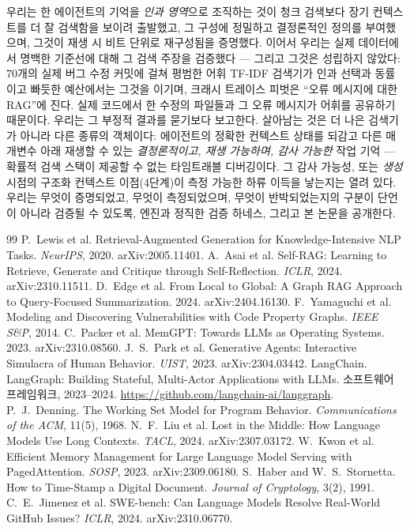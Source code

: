 \documentclass[11pt]{article}
\begin{document}
우리는 한 에이전트의 기억을 \emph{인과 영역}으로 조직하는 것이 청크 검색보다 장기 컨텍스트를 더 잘 검색함을 보이려
출발했고, 그 구성에 정밀하고 결정론적인 정의를 부여했으며, 그것이 재생 시 비트 단위로 재구성됨을 증명했다. 이어서 우리는
실제 데이터에서 명백한 기준선에 대해 그 검색 주장을 검증했다 --- 그리고 그것은 성립하지 않았다: $70$개의 실제 버그 수정
커밋에 걸쳐 평범한 어휘 TF-IDF 검색기가 인과 선택과 동률이고 빠듯한 예산에서는 그것을 이기며, 크래시 트레이스 피벗은
``오류 메시지에 대한 RAG''에 진다. 실제 코드에서 한 수정의 파일들과 그 오류 메시지가 어휘를 공유하기 때문이다. 우리는 그
부정적 결과를 묻기보다 보고한다. 살아남는 것은 더 나은 검색기가 아니라 다른 종류의 객체이다: 에이전트의 정확한 컨텍스트
상태를 되감고 다른 매개변수 아래 재생할 수 있는 \emph{결정론적이고, 재생 가능하며, 감사 가능한} 작업 기억 --- 확률적 검색
스택이 제공할 수 없는 타임트래블 디버깅이다. 그 감사 가능성, 또는 \emph{생성} 시점의 구조화 컨텍스트 이점(4단계)이
측정 가능한 하류 이득을 낳는지는 열려 있다. 우리는 무엇이 증명되었고, 무엇이 측정되었으며, 무엇이 반박되었는지의 구분이
단언이 아니라 검증될 수 있도록, 엔진과 정직한 검증 하네스, 그리고 본 논문을 공개한다.

\begin{thebibliography}{99}
 P.~Lewis et al. Retrieval-Augmented Generation for
Knowledge-Intensive NLP Tasks. \emph{NeurIPS}, 2020. arXiv:2005.11401.
 A.~Asai et al. Self-RAG: Learning to Retrieve, Generate
and Critique through Self-Reflection. \emph{ICLR}, 2024. arXiv:2310.11511.
 D.~Edge et al. From Local to Global: A Graph RAG
Approach to Query-Focused Summarization. 2024. arXiv:2404.16130.
 F.~Yamaguchi et al. Modeling and Discovering
Vulnerabilities with Code Property Graphs. \emph{IEEE S\&P}, 2014.
 C.~Packer et al. MemGPT: Towards LLMs as Operating
Systems. 2023. arXiv:2310.08560.
 J.~S.~Park et al. Generative Agents: Interactive
Simulacra of Human Behavior. \emph{UIST}, 2023. arXiv:2304.03442.
 LangChain. LangGraph: Building Stateful, Multi-Actor
Applications with LLMs. 소프트웨어 프레임워크, 2023--2024.
\url{https://github.com/langchain-ai/langgraph}.
 P.~J.~Denning. The Working Set Model for Program
Behavior. \emph{Communications of the ACM}, 11(5), 1968.
 N.~F.~Liu et al. Lost in the Middle: How Language Models Use
Long Contexts. \emph{TACL}, 2024. arXiv:2307.03172.
 W.~Kwon et al. Efficient Memory Management for Large
Language Model Serving with PagedAttention. \emph{SOSP}, 2023. arXiv:2309.06180.
 S.~Haber and W.~S.~Stornetta. How to Time-Stamp a
Digital Document. \emph{Journal of Cryptology}, 3(2), 1991.
 C.~E.~Jimenez et al. SWE-bench: Can Language Models
Resolve Real-World GitHub Issues? \emph{ICLR}, 2024. arXiv:2310.06770.
\end{thebibliography}
\end{document}
